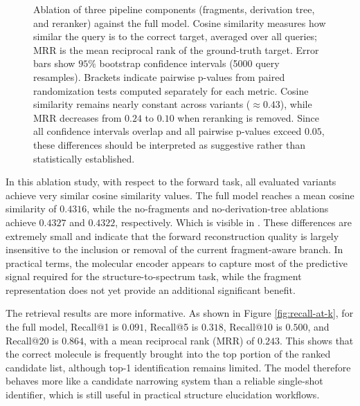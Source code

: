 \begin{figure}[H]
    \centering
    
    \caption[Cosine similarity and MRR for ablation variants]{
        Ablation of three pipeline components (fragments, derivation tree, and reranker) against the full model. 
        Cosine similarity measures how similar the query is to the correct target, averaged over all queries; 
        MRR is the mean reciprocal rank of the ground-truth target. 
        Error bars show $95\%$ bootstrap confidence intervals (5000 query resamples). 
        Brackets indicate pairwise p-values from paired randomization tests 
        computed separately for each metric. 
        Cosine similarity remains nearly constant across variants ($\approx 0.43$), 
        while MRR decreases from $0.24$ to $0.10$ when reranking is removed. 
        Since all confidence intervals overlap and all pairwise p-values exceed $0.05$, 
        these differences should be interpreted as suggestive rather than statistically established.
        }
    \label{fig:cosine-mrr}
\end{figure}

In this ablation study, with respect to the forward task, 
all evaluated variants achieve very similar cosine similarity values. 
The full model reaches a mean cosine similarity of $0.4316$, while the no-fragments 
and no-derivation-tree ablations achieve $0.4327$ and $0.4322$, respectively. Which is visible in .
These differences are extremely small and indicate that the forward reconstruction quality is 
largely insensitive to the inclusion or removal of the current fragment-aware branch. 
In practical terms, the molecular encoder appears to capture most of the predictive signal required 
for the structure-to-spectrum task, while the fragment representation 
does not yet provide an additional significant benefit.

The retrieval results are more informative. As shown in Figure \ref{fig:recall-at-k}, for the full model, 
Recall@1 is $0.091$, Recall@5 is $0.318$, Recall@10 is $0.500$, and Recall@20 is $0.864$, 
with a mean reciprocal rank (MRR) of $0.243$. This shows that the correct molecule is frequently brought 
into the top portion of the ranked candidate list, although top-1 identification remains limited. 
The model therefore behaves more like a candidate narrowing system than a reliable single-shot identifier, 
which is still useful in practical structure elucidation workflows.

